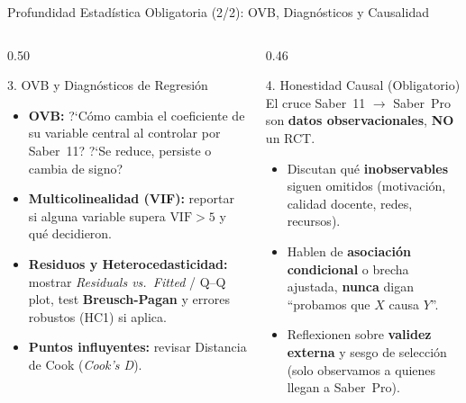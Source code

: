 \documentclass[aspectratio=169, 10pt]{beamer}
\begin{document}
\begin{frame}{Profundidad Estad\'istica Obligatoria (2/2): OVB, Diagn\'osticos y Causalidad}
  \begin{columns}[T]
    \begin{column}{0.50\textwidth}
      \begin{block}{3. OVB y Diagn\'osticos de Regresi\'on}
        \small
        \begin{itemize}\setlength{\itemsep}{3.5pt}
          \item \textbf{OVB:} ?`C\'omo cambia el coeficiente de su variable central al controlar por Saber~11? ?`Se reduce, persiste o cambia de signo?
          \item \textbf{Multicolinealidad (VIF):} reportar si alguna variable supera $\text{VIF} > 5$ y qu\'e decidieron.
          \item \textbf{Residuos y Heterocedasticidad:} mostrar \textit{Residuals vs.\ Fitted} / Q--Q plot, test \textbf{Breusch-Pagan} y errores robustos (HC1) si aplica.
          \item \textbf{Puntos influyentes:} revisar Distancia de Cook (\textit{Cook's D}).
        \end{itemize}
      \end{block}
    \end{column}
    \begin{column}{0.46\textwidth}
      \begin{alertblock}{4. Honestidad Causal (Obligatorio)}
        \small El cruce Saber~11 $\rightarrow$ Saber~Pro son \textbf{datos observacionales}, \textbf{NO} un RCT.
        \begin{itemize}\setlength{\itemsep}{3pt}
          \footnotesize
          \item Discutan qu\'e \textbf{inobservables} siguen omitidos (motivaci\'on, calidad docente, redes, recursos).
          \item Hablen de \textbf{asociaci\'on condicional} o brecha ajustada, \textbf{nunca} digan ``probamos que $X$ causa $Y$''.
          \item Reflexionen sobre \textbf{validez externa} y sesgo de selecci\'on (solo observamos a quienes llegan a Saber~Pro).
        \end{itemize}
      \end{alertblock}
    \end{column}
  \end{columns}
\end{frame}
\end{document}
